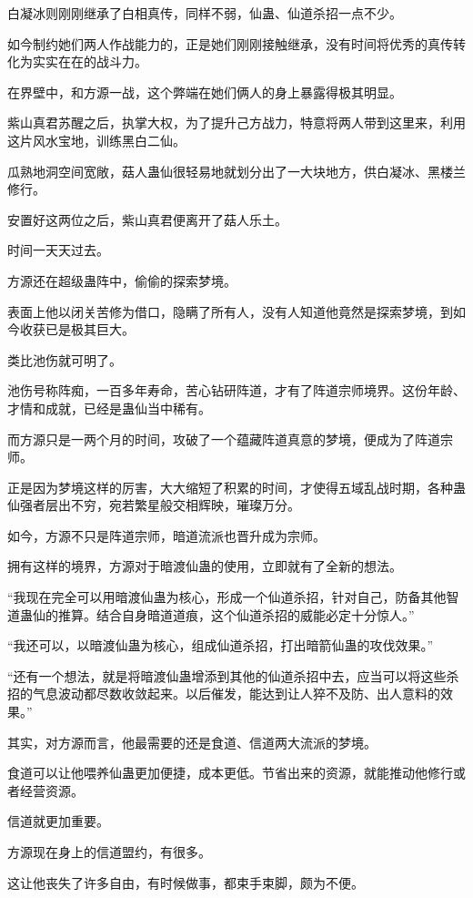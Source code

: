 \begin{this_body}
白凝冰则刚刚继承了白相真传，同样不弱，仙蛊、仙道杀招一点不少。

如今制约她们两人作战能力的，正是她们刚刚接触继承，没有时间将优秀的真传转化为实实在在的战斗力。

在界壁中，和方源一战，这个弊端在她们俩人的身上暴露得极其明显。

紫山真君苏醒之后，执掌大权，为了提升己方战力，特意将两人带到这里来，利用这片风水宝地，训练黑白二仙。

瓜熟地洞空间宽敞，菇人蛊仙很轻易地就划分出了一大块地方，供白凝冰、黑楼兰修行。

安置好这两位之后，紫山真君便离开了菇人乐土。

时间一天天过去。

方源还在超级蛊阵中，偷偷的探索梦境。

表面上他以闭关苦修为借口，隐瞒了所有人，没有人知道他竟然是探索梦境，到如今收获已是极其巨大。

类比池伤就可明了。

池伤号称阵痴，一百多年寿命，苦心钻研阵道，才有了阵道宗师境界。这份年龄、才情和成就，已经是蛊仙当中稀有。

而方源只是一两个月的时间，攻破了一个蕴藏阵道真意的梦境，便成为了阵道宗师。

正是因为梦境这样的厉害，大大缩短了积累的时间，才使得五域乱战时期，各种蛊仙强者层出不穷，宛若繁星般交相辉映，璀璨万分。

如今，方源不只是阵道宗师，暗道流派也晋升成为宗师。

拥有这样的境界，方源对于暗渡仙蛊的使用，立即就有了全新的想法。

“我现在完全可以用暗渡仙蛊为核心，形成一个仙道杀招，针对自己，防备其他智道蛊仙的推算。结合自身暗道道痕，这个仙道杀招的威能必定十分惊人。”

“我还可以，以暗渡仙蛊为核心，组成仙道杀招，打出暗箭仙蛊的攻伐效果。”

“还有一个想法，就是将暗渡仙蛊增添到其他的仙道杀招中去，应当可以将这些杀招的气息波动都尽数收敛起来。以后催发，能达到让人猝不及防、出人意料的效果。”

其实，对方源而言，他最需要的还是食道、信道两大流派的梦境。

食道可以让他喂养仙蛊更加便捷，成本更低。节省出来的资源，就能推动他修行或者经营资源。

信道就更加重要。

方源现在身上的信道盟约，有很多。

这让他丧失了许多自由，有时候做事，都束手束脚，颇为不便。


\end{this_body}
